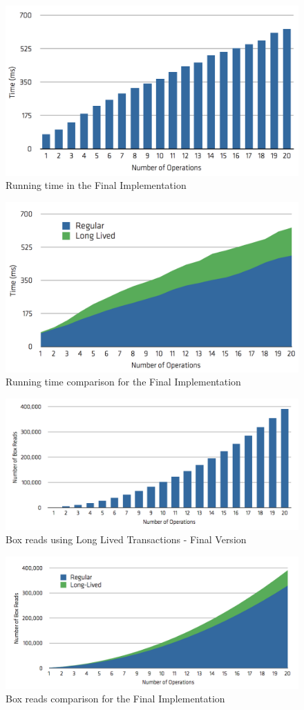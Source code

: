 \begin{figure}
\centering
\includegraphics[width=0.9\linewidth]{time-long-final}
\caption{Running time in the Final Implementation}
\label{fig:runtimeFinal}
\end{figure}

\begin{figure}
\centering
\includegraphics[width=0.9\linewidth]{comparison-final}
\caption{Running time comparison for the Final Implementation}
\label{fig:comparisonFinal}
\end{figure}


\begin{figure}
\centering
\includegraphics[width=0.9\linewidth]{box-long-final}
\caption{Box reads using Long Lived Transactions - Final Version}
\label{fig:boxesFinal}
\end{figure}

\begin{figure}
\centering
\includegraphics[width=0.9\linewidth]{box-comparison-final}
\caption{Box reads comparison for the Final Implementation}
\label{fig:boxComparisonFinal}
\end{figure}


